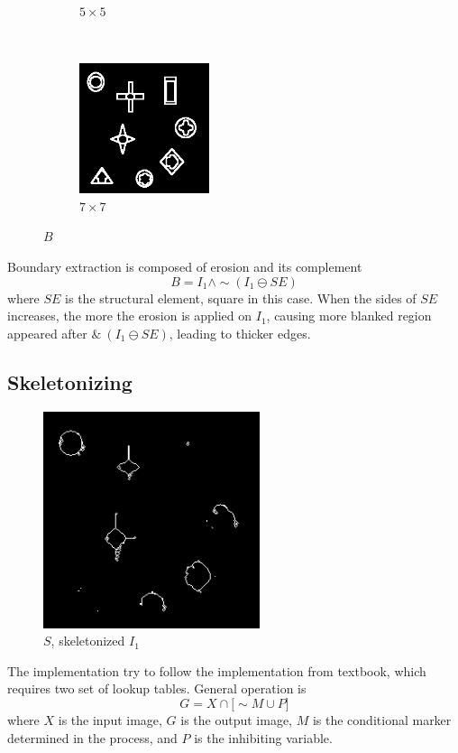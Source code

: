 \documentclass[12pt]{article}
\begin{document}
\begin{figure}[H]
\begin{subfigure}[t]{0.24\textwidth}
        \caption{$5 \times 5$}
    \end{subfigure}%
    ~
    \begin{subfigure}[t]{0.24\textwidth}
        \centering
        \includegraphics[height=1.5in]{images/B_m7}
        \caption{$7 \times 7$}
    \end{subfigure}
    \caption{$B$}
\end{figure}
Boundary extraction is composed of erosion and its complement
\begin{equation}
	B = I_1 \wedge \sim (I_1 \ominus SE)
\end{equation}
where $SE$ is the structural element, square in this case.
When the sides of $SE$ increases, the more the erosion is applied on $I_1$, causing more blanked region appeared after $\& ~(I_1 \ominus SE)$, leading to thicker edges.

\subsection*{Skeletonizing}
\begin{figure}[H]
    \centering
    \includegraphics[height=2.5in]{images/S}
    \caption{$S$, skeletonized $I_1$}
\end{figure}
The implementation try to follow the implementation from textbook, which requires two set of lookup tables. General operation is 
\begin{equation}
	G = X \cap \lbrack \sim M \cup P \rbrack
\end{equation}
where $X$ is the input image, $G$ is the output image, $M$ is the conditional marker determined in the process, and $P$ is the inhibiting variable.
\end{document}
